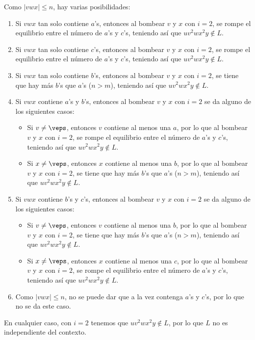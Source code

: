 \begin{ejercicio}
\begin{enumerate}
        Como $|vwx|\leq n$, hay varias posibilidades:
        \begin{enumerate}
            \item Si $vwx$ tan solo contiene $a$'s, entonces al bombear $v$ y $x$ con $i=2$, se rompe el equilibrio entre el número de $a$'s y $c$'s, teniendo así que $uv^2wx^2y\notin L$.
            \item Si $vwx$ tan solo contiene $c$'s, entonces al bombear $v$ y $x$ con $i=2$, se rompe el equilibrio entre el número de $a$'s y $c$'s, teniendo así que $uv^2wx^2y\notin L$.
            \item Si $vwx$ tan solo contiene $b$'s, entonces al bombear $v$ y $x$ con $i=2$, se tiene que hay más $b$'s que $a$'s ($n>m$), teniendo así que $uv^2wx^2y\notin L$.
            \item Si $vwx$ contiene $a$'s y $b$'s, entonces al bombear $v$ y $x$ con $i=2$ se da alguno de los siguientes casos:
            \begin{itemize}
                \item Si $v\neq \veps$, entonces $v$ contiene al menos una $a$, por lo que al bombear $v$ y $x$ con $i=2$, se rompe el equilibrio entre el número de $a$'s y $c$'s, teniendo así que $uv^2wx^2y\notin L$.
                \item Si $x\neq \veps$, entonces $x$ contiene al menos una $b$, por lo que al bombear $v$ y $x$ con $i=2$, se tiene que hay más $b$'s que $a$'s ($n>m$), teniendo así que $uv^2wx^2y\notin L$.
            \end{itemize}
            \item Si $vwx$ contiene $b$'s y $c$'s, entonces al bombear $v$ y $x$ con $i=2$ se da alguno de los siguientes casos:
            \begin{itemize}
                \item Si $v\neq \veps$, entonces $v$ contiene al menos una $b$, por lo que al bombear $v$ y $x$ con $i=2$, se tiene que hay más $b$'s que $a$'s ($n>m$), teniendo así que $uv^2wx^2y\notin L$.
                \item Si $x\neq \veps$, entonces $x$ contiene al menos una $c$, por lo que al bombear $v$ y $x$ con $i=2$, se rompe el equilibrio entre el número de $a$'s y $c$'s, teniendo así que $uv^2wx^2y\notin L$.
            \end{itemize}
            \item Como $|vwx|\leq n$, no se puede dar que a la vez contenga $a$'s y $c$'s, por lo que no se da este caso.
        \end{enumerate}

        En cualquier caso, con $i=2$ tenemos que $uv^2wx^2y\notin L$, por lo que $L$ no es independiente del contexto.
    \end{enumerate}
\end{ejercicio}

